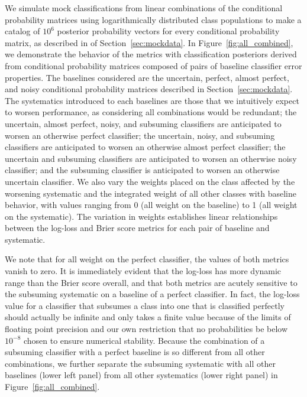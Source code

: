 We simulate mock classifications from linear combinations of the conditional probability matrices using logarithmically distributed class populations to make a catalog of $10^{6}$ posterior probability vectors for every conditional probability matrix, as described in of Section~\ref{sec:mockdata}.
In Figure~\ref{fig:all_combined}, we demonstrate the behavior of the metrics with classification posteriors derived from conditional probability matrices composed of pairs of baseline classifier error properties.
The baselines considered are the uncertain, perfect, almost perfect, and noisy conditional probability matrices described in Section~\ref{sec:mockdata}.
The systematics introduced to each baselines are those that we intuitively expect to worsen performance, as considering all combinations would be redundant;
the uncertain, almost perfect, noisy, and subsuming classifiers are anticipated to worsen an otherwise perfect classifier;
the uncertain, noisy, and subsuming classifiers are anticipated to worsen an otherwise almost perfect classifier;
the uncertain and subsuming classifiers are anticipated to worsen an otherwise noisy classifier;
and the subsuming classifier is anticipated to worsen an otherwise uncertain classifier.
We also vary the weights placed on the class affected by the worsening systematic and the integrated weight of all other classes with baseline behavior, with values ranging from 0 (all weight on the baseline) to 1 (all weight on the systematic).
The variation in weights establishes linear relationships between the log-loss and Brier score metrics for each pair of baseline and systematic.

We note that for all weight on the perfect classifier, the values of both metrics vanish to zero.
It is immediately evident that the log-loss has more dynamic range than the Brier score overall, and that both metrics are acutely sensitive to the subsuming systematic on a baseline of a perfect classifier.
In fact, the log-loss value for a classifier that subsumes a class into one that is classified perfectly should actually be infinite and only takes a finite value because of the limits of floating point precision and our own restriction that no probabilities be below $10^{-8}$ chosen to ensure numerical stability.
Because the combination of a subsuming classifier with a perfect baseline is so different from all other combinations, we further separate the subsuming systematic with all other baselines (lower left panel) from all other systematics (lower right panel) in Figure~\ref{fig:all_combined}.

